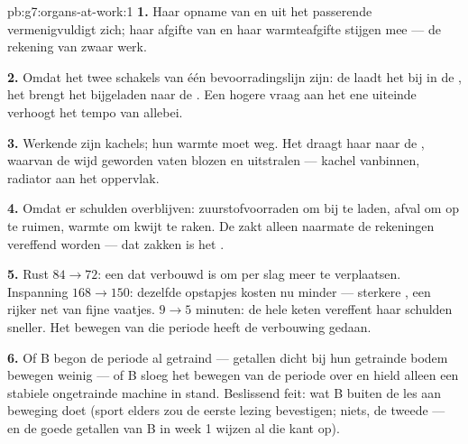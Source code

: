\begin{solution}{pb:g7:organs-at-work:1}
\textbf{1.} Haar opname van  en  uit het passerende 
vermenigvuldigt zich; haar afgifte van  en haar
warmteafgifte stijgen mee --- de rekening van zwaar werk.

\textbf{2.} Omdat het twee schakels van één bevoorradingslijn zijn: de
 laadt het  bij in de , het  brengt het
bijgeladen  naar de . Een hogere vraag aan het ene uiteinde
verhoogt het tempo van allebei.

\textbf{3.} Werkende  zijn kachels; hun warmte moet weg. Het 
draagt haar naar de , waarvan de wijd geworden vaten blozen en
uitstralen --- kachel vanbinnen, radiator aan het oppervlak.

\textbf{4.} Omdat er schulden overblijven: zuurstofvoorraden om bij te
laden, afval om op te ruimen, warmte om kwijt te raken. De  zakt
alleen naarmate de rekeningen vereffend worden --- dat zakken is het
.

\textbf{5.} Rust $84 \to 72$: een  dat verbouwd is om per slag meer
te verplaatsen. Inspanning $168 \to 150$: dezelfde opstapjes kosten nu
minder --- sterkere , een rijker net van fijne vaatjes. 
$9 \to 5$ minuten: de hele keten vereffent haar schulden sneller. Het
bewegen van die periode heeft de verbouwing gedaan.

\textbf{6.} Of B begon de periode al getraind --- getallen dicht bij hun
getrainde bodem bewegen weinig --- of B sloeg het bewegen van de periode
over en hield alleen een stabiele ongetrainde machine in stand.
Beslissend feit: wat B buiten de les aan beweging doet (sport elders zou
de eerste lezing bevestigen; niets, de tweede --- en de goede getallen van
B in week 1 wijzen al die kant op).


\end{solution}
